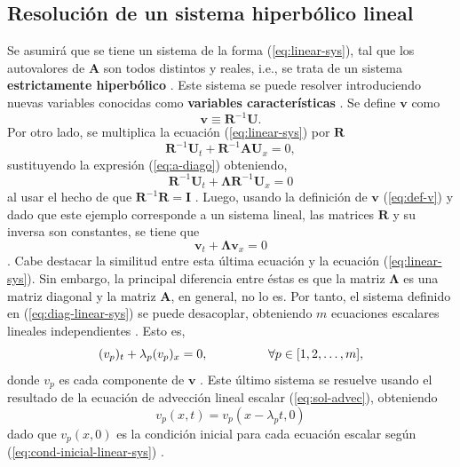 \subsection{Resolución de un sistema hiperbólico lineal}
Se asumirá que se tiene un sistema de la forma (\ref{eq:linear-sys}), tal que los autovalores de $\mathbf{A}$ son todos distintos y reales, i.e., se trata de un sistema \textbf{estrictamente hiperbólico} \cite{Leveque}. Este sistema se puede resolver introduciendo nuevas variables conocidas como \textbf{variables características} \cite{Leveque}. Se define $\mathbf{v}$ como
\begin{equation}
	\mathbf{v} \equiv \mathbf{R}^{-1} \mathbf{U}.
	\label{eq:def-v}
\end{equation}
Por otro lado, se multiplica la ecuación (\ref{eq:linear-sys}) por $\mathbf{R}$
\begin{equation}
	\mathbf{R}^{-1}\mathbf{U}_t + \mathbf{R}^{-1} \mathbf{A} \mathbf{U}_x = 0,
\end{equation}
sustituyendo la expresión (\ref{eq:a-diago}) obteniendo,
\begin{equation}
	\mathbf{R}^{-1}\mathbf{U}_t + \mathbf{\Lambda} \mathbf{R}^{-1} \mathbf{U}_x = 0
\end{equation}
al usar el hecho de que $\mathbf{R}^{-1} \mathbf{R} = \mathbf{I}$ \cite{Leveque}. Luego, usando la definición de $\mathbf{v}$ (\ref{eq:def-v}) y dado que este ejemplo corresponde a un sistema lineal, las matrices $\mathbf{R}$ y su inversa son constantes, se tiene que
\begin{equation}
	\mathbf{v}_t + \mathbf{\Lambda} \mathbf{v}_x = 0
	\label{eq:diag-linear-sys}
\end{equation}
\cite{Leveque}. 
Cabe destacar la similitud entre esta última ecuación y la ecuación (\ref{eq:linear-sys}). Sin embargo, la principal diferencia entre éstas es que la matriz $\mathbf{\Lambda}$ es una matriz diagonal y la matriz $\mathbf{A}$, en general, no lo es. Por tanto, el sistema definido en (\ref{eq:diag-linear-sys}) se puede desacoplar, obteniendo $m$ ecuaciones escalares lineales independientes \cite{Leveque}. Esto es,
\begin{equation}
	(v_p)_t + \lambda_{p} (v_{p})_x = 0, \hspace{17mm} \forall p \in [1,2, \dots, m],
\end{equation}
donde $v_p$ es cada componente de $\mathbf{v}$ \cite{Leveque}. Este último sistema se resuelve usando el resultado de la ecuación de advección lineal escalar (\ref{eq:sol-advec}), obteniendo
\begin{equation}
	v_p(x,t) = v_p(x - \lambda_{p}t, 0)
\end{equation}
dado que $v_p(x, 0)$ es la condición inicial para cada ecuación escalar según (\ref{eq:cond-inicial-linear-sys}) \cite{Leveque}.

